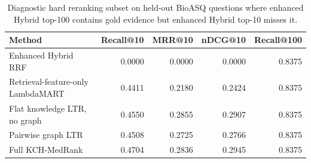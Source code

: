 \begin{table}[t]
\centering
\small
\caption{Diagnostic hard reranking subset on held-out BioASQ questions where enhanced Hybrid top-100 contains gold evidence but enhanced Hybrid top-10 misses it.}
\label{tab:hard-subset-diagnostic}
\begin{tabular}{lrrrr}
\toprule
Method & Recall@10 & MRR@10 & nDCG@10 & Recall@100 \\
\midrule
Enhanced Hybrid RRF & 0.0000 & 0.0000 & 0.0000 & 0.8375 \\
Retrieval-feature-only LambdaMART & 0.4411 & 0.2180 & 0.2424 & 0.8375 \\
Flat knowledge LTR, no graph & 0.4550 & 0.2855 & 0.2907 & 0.8375 \\
Pairwise graph LTR & 0.4508 & 0.2725 & 0.2766 & 0.8375 \\
Full KCH-MedRank & 0.4704 & 0.2836 & 0.2945 & 0.8375 \\
\bottomrule
\end{tabular}
\end{table}
